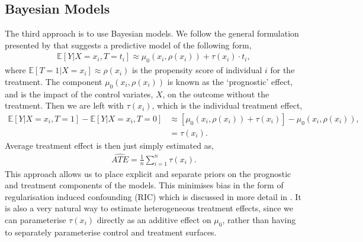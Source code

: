 \documentclass[12pt, a4paper]{article}
\begin{document}
\subsection{Bayesian Models}

The third approach is to use Bayesian models. We follow the general formulation
presented by \cite{hahn2020} that suggests a predictive model of the following
form,
\begin{align}
  \mathbb{E}[Y|X{=}x_i, T{=}t_i] \approx \mu_0(x_i, \rho(x_i)) 
    + \tau(x_i)\cdot t_i, \label{eq:bayesmods}
\end{align}
where $\mathbb{E}[T=1|X{=}x_i] \approx \rho(x_i)$ is the propensity score of
individual $i$ for the treatment. The component $\mu_0(x_i, \rho(x_i))$ is
known as the `prognostic' effect, and is the impact of the control variates,
$X$, on the outcome without the treatment. Then we are left with $\tau(x_i)$,
which is the individual treatment effect,
\begin{align*}
  \mathbb{E}[Y|X{=}x_i, T{=}1] - \mathbb{E}[Y|X{=}x_i, T{=}0] &\approx 
    \left[\mu_0(x_i, \rho(x_i)) + \tau(x_i)\right] - \mu_0(x_i, \rho(x_i)), \\
    &=\tau(x_i).
\end{align*}
Average treatment effect is then just simply estimated as,
\begin{align*}
  \hat{ATE} = \frac{1}{n}\sum^n_{i=1} \tau(x_i).
\end{align*}
This approach allows us to place explicit and separate priors on the prognostic and treatment
components of the models. This minimises bias in the form of
regularisation induced confounding (RIC) which is discussed in more detail in
\cite{hahn2018, hahn2020}. It is also a very natural way to estimate
heterogeneous treatment effects, since we can parameterise $\tau(x_i)$
directly as an additive effect on $\mu_0$, rather than having to separately 
parameterise control and treatment surfaces.

\end{document}
